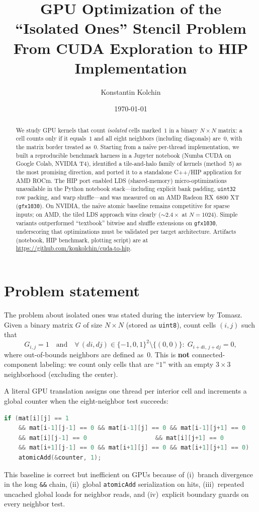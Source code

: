\documentclass[11pt,a4paper]{article}
\title{GPU Optimization of the\\``Isolated Ones'' Stencil Problem\\[0.4em]
\large From CUDA Exploration to HIP Implementation}
\author{Konstantin Kolchin}
\date{\today}
\begin{document}
\maketitle

\begin{abstract}
We study GPU kernels that count \emph{isolated} cells marked~$1$ in a binary
$N\times N$ matrix: a cell counts only if it equals~$1$ and all eight
neighbors (including diagonals) are~$0$, with the matrix border treated as~$0$.
Starting from a na\"ive per-thread implementation, we built a reproducible
benchmark harness in a Jupyter notebook (Numba CUDA on Google Colab, NVIDIA T4),
identified a tile-and-halo family of kernels (method~5) as the most promising
direction, and ported it to a standalone C++/HIP application for AMD ROCm.
The HIP port enabled LDS (shared-memory) micro-optimizations unavailable in the
Python notebook stack---including explicit bank padding, \texttt{uint32} row
packing, and warp shuffle---and was measured on an AMD Radeon RX~6800 XT
(\texttt{gfx1030}).
On NVIDIA, the na\"ive atomic baseline remains competitive for sparse inputs;
on AMD, the tiled LDS approach wins clearly ($\sim\!2.4\times$ at $N{=}1024$).
Simple variants outperformed ``textbook'' bitwise and shuffle extensions on
\texttt{gfx1030}, underscoring that optimizations must be validated per target
architecture.
Artifacts (notebook, HIP benchmark, plotting script) are at
\url{https://github.com/konkolchin/cuda-to-hip}.
\end{abstract}

\section{Problem statement}
\label{sec:problem}

The problem about isolated ones was stated during the interview by Tomasz.
Given a binary matrix $G$ of size $N\times N$ (stored as \texttt{uint8}), count
cells $(i,j)$ such that
\begin{equation}
  G_{i,j} = 1
  \quad\text{and}\quad
  \forall\,(di,dj) \in \{-1,0,1\}^2 \setminus \{(0,0)\}:\;
  G_{i+di,\,j+dj} = 0,
\end{equation}
where out-of-bounds neighbors are defined as~$0$.
This is \textbf{not} connected-component labeling: we count only cells that are
``$1$'' with an empty $3\times 3$ neighborhood (excluding the center).

A literal GPU translation assigns one thread per interior cell and increments a
global counter when the eight-neighbor test succeeds:
\begin{lstlisting}[language=C++]
if (mat[i][j] == 1
    && mat[i-1][j-1] == 0 && mat[i-1][j] == 0 && mat[i-1][j+1] == 0
    && mat[i][j-1] == 0                   && mat[i][j+1] == 0
    && mat[i+1][j-1] == 0 && mat[i+1][j] == 0 && mat[i+1][j+1] == 0)
    atomicAdd(&counter, 1);
\end{lstlisting}
This baseline is correct but inefficient on GPUs because of (i)~branch divergence
in the long \texttt{\&\&} chain, (ii)~global \texttt{atomicAdd} serialization on
hits, (iii)~repeated uncached global loads for neighbor reads, and (iv)~explicit
boundary guards on every neighbor test.
\end{document}
